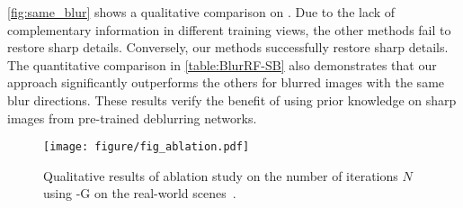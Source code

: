 \cref{fig:same_blur} shows a qualitative comparison on \SBDataName{}.
Due to the lack of complementary information in different training views, the other methods fail to restore sharp details.
Conversely, our methods successfully restore sharp details.
The quantitative comparison in \cref{table:BlurRF-SB} also demonstrates that our approach significantly outperforms the others for blurred images with the same blur directions.
These results verify the benefit of using prior knowledge on sharp images from pre-trained deblurring networks.


\begin{table}[t]
\centering
{}
    \caption{Quantitative results of ablation study on the number of iterations $N$ using \MethodName{}-G on the test sets of \SynthDataName{}.}
    \label{table:ablation_cycle}
    \vspace{-3mm}
\end{table}

\begin{figure}[t]
    \centering
    \texttt{[image: figure/fig\_ablation.pdf]}
    \caption{Qualitative results of ablation study on the number of iterations $N$ using \MethodName{}-G on the real-world scenes~\cite{ma2022deblurnerf}.
    }
    \vspace{-3mm}
    \label{fig:ablation_cycle}
\end{figure}


